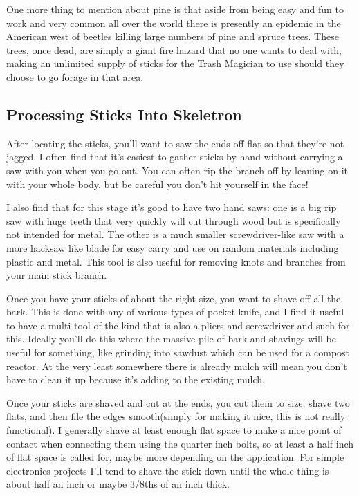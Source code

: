 One more thing to mention about pine is that aside from being easy and
fun to work and very common all over the world there is presently an
epidemic in the American west of beetles killing large numbers of pine
and spruce trees. These trees, once dead, are simply a giant fire hazard
that no one wants to deal with, making an unlimited supply of sticks for
the Trash Magician to use should they choose to go forage in that area.

\subsection{Processing Sticks Into
Skeletron}\label{processing-sticks-into-skeletron}

After locating the sticks, you'll want to saw the ends off flat so that
they're not jagged. I often find that it's easiest to gather sticks by
hand without carrying a saw with you when you go out. You can often rip
the branch off by leaning on it with your whole body, but be careful you
don't hit yourself in the face!

I also find that for this stage it's good to have two hand saws: one is
a big rip saw with huge teeth that very quickly will cut through wood
but is specifically not intended for metal. The other is a much smaller
screwdriver-like saw with a more hacksaw like blade for easy carry and
use on random materials including plastic and metal. This tool is also
useful for removing knots and branches from your main stick branch.

Once you have your sticks of about the right size, you want to shave off
all the bark. This is done with any of various types of pocket knife,
and I find it useful to have a multi-tool of the kind that is also a
pliers and screwdriver and such for this. Ideally you'll do this where
the massive pile of bark and shavings will be useful for something, like
grinding into sawdust which can be used for a compost reactor. At the
very least somewhere there is already mulch will mean you don't have to
clean it up because it's adding to the existing mulch.

Once your sticks are shaved and cut at the ends, you cut them to size,
shave two flats, and then file the edges smooth(simply for making it
nice, this is not really functional). I generally shave at least enough
flat space to make a nice point of contact when connecting them using
the quarter inch bolts, so at least a half inch of flat space is called
for, maybe more depending on the application. For simple electronics
projects I'll tend to shave the stick down until the whole thing is
about half an inch or maybe 3/8ths of an inch thick.

